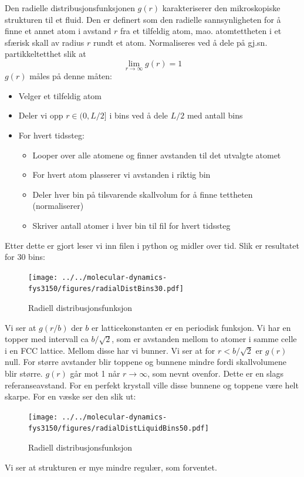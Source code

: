 \documentclass[english, a4paper]{article}
\begin{document}
Den radielle distribusjonsfunksjonen $g(r)$ karakteriserer den mikroskopiske strukturen til et fluid.
Den er definert som den radielle sannsynligheten for å finne et annet atom i avstand $r$ fra et 
tilfeldig atom, mao. atomtettheten i et sfærisk skall av radius $r$ rundt et atom. 
Normaliseres ved å dele på gj.sn. partikkeltetthet slik at
\begin{equation}
 \lim_{r\to\infty} g(r) = 1
\end{equation}
$g(r)$ måles på denne måten:
\begin{itemize}
 \item Velger et tilfeldig atom
 \item Deler vi opp $r \in (0,L/2]$ i bins ved å dele $L/2$ med antall bins
 \item For hvert tidssteg:
 \begin{itemize}
   \item Looper over alle atomene og finner avstanden til det utvalgte atomet
   \item For hvert atom plasserer vi avstanden i riktig bin 
   \item Deler hver bin på tilsvarende skallvolum for å finne tettheten (normaliserer)
   \item Skriver antall atomer i hver bin til fil for hvert tidssteg
 \end{itemize}
\end{itemize}
Etter dette er gjort leser vi inn filen i python og midler over tid. 
Slik er resultatet for 30 bins:
\begin{figure}[H]
  \begin{center}
  \texttt{[image: ../../molecular-dynamics-fys3150/figures/radialDistBins30.pdf]}
  \caption{Radiell distribusjonsfunksjon}
  \label{fig:fig5}
  \end{center}
\end{figure}
Vi ser at $g(r/b)$ der $b$ er latticekonstanten er en periodisk funksjon. Vi har en topper med
intervall ca $b/\sqrt{2}$, som er avstanden mellom to atomer i samme celle i en FCC lattice. 
Mellom disse har vi bunner. Vi ser at for $r < b/\sqrt{2}$ er $g(r)$ null. For større avstander
blir toppene og bunnene mindre fordi skallvolumene blir større. $g(r)$ går mot 1 når
$r \to \infty$, som nevnt ovenfor. Dette er en slags referanseavstand. 
For en perfekt krystall ville disse bunnene og toppene være helt skarpe. 
For en væske ser den slik ut:
\begin{figure}[H]
  \begin{center}
  \texttt{[image: ../../molecular-dynamics-fys3150/figures/radialDistLiquidBins50.pdf]}
  \caption{Radiell distribusjonsfunksjon}
  \label{fig:fig5}
  \end{center}
\end{figure}
Vi ser at strukturen er mye mindre regulær, som forventet. 
\end{document}
